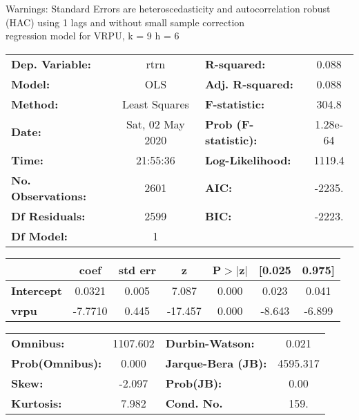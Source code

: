 Warnings: \newline
 [1] Standard Errors are heteroscedasticity and autocorrelation robust (HAC) using 1 lags and without small sample correction\\ 

regression model for VRPU, k = 9 h = 6\begin{center}
\begin{tabular}{lclc}
\toprule
\textbf{Dep. Variable:}    &       rtrn       & \textbf{  R-squared:         } &     0.088   \\
\textbf{Model:}            &       OLS        & \textbf{  Adj. R-squared:    } &     0.088   \\
\textbf{Method:}           &  Least Squares   & \textbf{  F-statistic:       } &     304.8   \\
\textbf{Date:}             & Sat, 02 May 2020 & \textbf{  Prob (F-statistic):} &  1.28e-64   \\
\textbf{Time:}             &     21:55:36     & \textbf{  Log-Likelihood:    } &    1119.4   \\
\textbf{No. Observations:} &        2601      & \textbf{  AIC:               } &    -2235.   \\
\textbf{Df Residuals:}     &        2599      & \textbf{  BIC:               } &    -2223.   \\
\textbf{Df Model:}         &           1      & \textbf{                     } &             \\
\bottomrule
\end{tabular}
\begin{tabular}{lcccccc}
                   & \textbf{coef} & \textbf{std err} & \textbf{z} & \textbf{P$> |$z$|$} & \textbf{[0.025} & \textbf{0.975]}  \\
\midrule
\textbf{Intercept} &       0.0321  &        0.005     &     7.087  &         0.000        &        0.023    &        0.041     \\
\textbf{vrpu}      &      -7.7710  &        0.445     &   -17.457  &         0.000        &       -8.643    &       -6.899     \\
\bottomrule
\end{tabular}
\begin{tabular}{lclc}
\textbf{Omnibus:}       & 1107.602 & \textbf{  Durbin-Watson:     } &    0.021  \\
\textbf{Prob(Omnibus):} &   0.000  & \textbf{  Jarque-Bera (JB):  } & 4595.317  \\
\textbf{Skew:}          &  -2.097  & \textbf{  Prob(JB):          } &     0.00  \\
\textbf{Kurtosis:}      &   7.982  & \textbf{  Cond. No.          } &     159.  \\
\bottomrule
\end{tabular}
\end{center}

